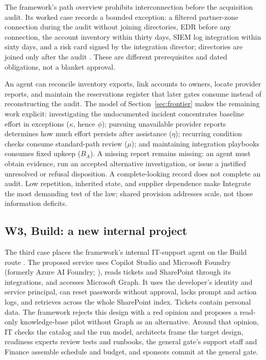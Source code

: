 The framework's path overview prohibits interconnection before the acquisition audit. Its worked case
records a bounded exception: a filtered partner-zone connection during the audit without joining
directories, EDR before any connection, the account inventory within thirty days, SIEM log integration
within sixty days, and a risk card signed by the integration director; directories are joined only
after the audit \citep[pp.~18, 104]{canale2026}. These are different prerequisites and dated
obligations, not a blanket approval.

An agent can reconcile inventory exports, link accounts to owners, locate provider reports, and
maintain the reservations register that later gates consume instead of reconstructing the audit. The
model of Section~\ref{sec:frontier} makes the remaining work explicit: investigating the undocumented
incident concentrates baseline effort in exceptions ($\kappa$, hence $\phi$); pursuing unavailable
provider reports determines how much effort persists after assistance ($\eta$); recurring condition
checks consume standard-path review ($\mu$); and maintaining integration playbooks consumes fixed
upkeep ($B_A$). A missing report remains missing: an agent must obtain evidence, run an accepted
alternative investigation, or issue a justified unresolved or refusal disposition. A complete-looking
record does not complete an audit. Low repetition, inherited state, and supplier dependence make
Integrate the most demanding test of the law; shared provision addresses scale, not those information
deficits.

\subsection{W3, Build: a new internal project}

The third case places the framework's internal IT-support agent on the Build route
\citep[pp.~19, 105]{canale2026}. The proposed service uses Copilot Studio and Microsoft Foundry
(formerly Azure AI Foundry; \citealp{msfoundry2026}), reads tickets and SharePoint through its
integrations, and accesses Microsoft Graph. It uses the developer's identity and service principal, can
reset passwords without approval, lacks prompt and action logs, and retrieves across the whole
SharePoint index. Tickets contain personal data. The framework rejects this design with a red opinion
and proposes a read-only knowledge-base pilot without Graph as an alternative. Around that opinion, IT
checks the catalog and the run model, architects frame the target design, readiness experts review
tests and runbooks, the general gate's support staff and Finance assemble schedule and budget, and
sponsors commit at the general gate.

